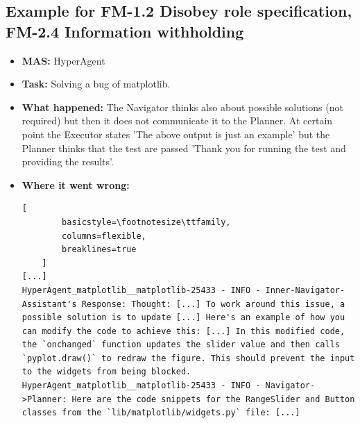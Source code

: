 \subsection{Example for FM-1.2 Disobey role specification, FM-2.4 Information withholding}\label{ex:fm2.6}
\begin{itemize}
    \item \textbf{MAS:} HyperAgent 
    \item \textbf{Task:} Solving a bug of matplotlib.
    \item \textbf{What happened:} The Navigator thinks also about possible solutions (not required) but then it does not communicate it to the Planner. At certain point the Executor states 'The above output is just an example' but the Planner thinks that the test are passed 'Thank you for running the test and providing the results'. 
    \item \textbf{Where it went wrong:}
    \begin{lstlisting}[
        basicstyle=\footnotesize\ttfamily,
        columns=flexible,
        breaklines=true
    ]
[...]
HyperAgent_matplotlib__matplotlib-25433 - INFO - Inner-Navigator-Assistant's Response: Thought: [...] To work around this issue, a possible solution is to update [...] Here's an example of how you can modify the code to achieve this: [...] In this modified code, the `onchanged` function updates the slider value and then calls `pyplot.draw()` to redraw the figure. This should prevent the input to the widgets from being blocked. 
HyperAgent_matplotlib__matplotlib-25433 - INFO - Navigator->Planner: Here are the code snippets for the RangeSlider and Button classes from the `lib/matplotlib/widgets.py` file: [...]
    \end{lstlisting}
\end{itemize}


